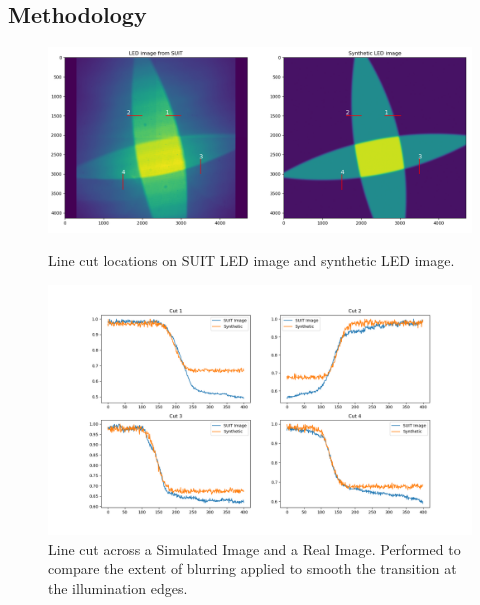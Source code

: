 \documentclass[11pt,a4paper]{article}
\begin{document}
			\subsection{Methodology}
					\begin{figure}
				\centering
				\includegraphics[width=1\linewidth]{pics/image_cuts}
				\caption{Line cut locations on SUIT LED image and synthetic LED image.}
				\label{fig:imagecuts}
				
				\centering
				\includegraphics[width=1\linewidth]{pics/cut_plots_synth_p2p_1percent.png}
				\caption{Line cut across a Simulated Image and a Real Image. Performed to compare the extent of blurring applied to smooth the transition at the illumination edges.}
				\label{fig:linecut}
			\end{figure}
			
\end{document}

